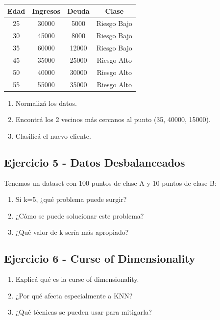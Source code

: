 \documentclass[12pt]{article}
\begin{document}
\begin{table}[H]
    \centering
    \begin{tabular}{cccc}
        \toprule
        \textbf{Edad} & \textbf{Ingresos} & \textbf{Deuda} & \textbf{Clase} \\
        \midrule
        25 & 30000 & 5000 & Riesgo Bajo \\
        30 & 45000 & 8000 & Riesgo Bajo \\
        35 & 60000 & 12000 & Riesgo Bajo \\
        45 & 35000 & 25000 & Riesgo Alto \\
        50 & 40000 & 30000 & Riesgo Alto \\
        55 & 55000 & 35000 & Riesgo Alto \\
        \bottomrule
    \end{tabular}
\end{table}

\begin{enumerate}
    \item Normalizá los datos.
    \item Encontrá los 2 vecinos más cercanos al punto (35, 40000, 15000).
    \item Clasificá el nuevo cliente.
\end{enumerate}

\subsection{Ejercicio 5 - Datos Desbalanceados}

Tenemos un dataset con 100 puntos de clase A y 10 puntos de clase B:

\begin{enumerate}
    \item Si k=5, ¿qué problema puede surgir?
    \item ¿Cómo se puede solucionar este problema?
    \item ¿Qué valor de k sería más apropiado?
\end{enumerate}

\subsection{Ejercicio 6 - Curse of Dimensionality}

\begin{enumerate}
    \item Explicá qué es la curse of dimensionality.
    \item ¿Por qué afecta especialmente a KNN?
    \item ¿Qué técnicas se pueden usar para mitigarla?
\end{enumerate}
\end{document}
